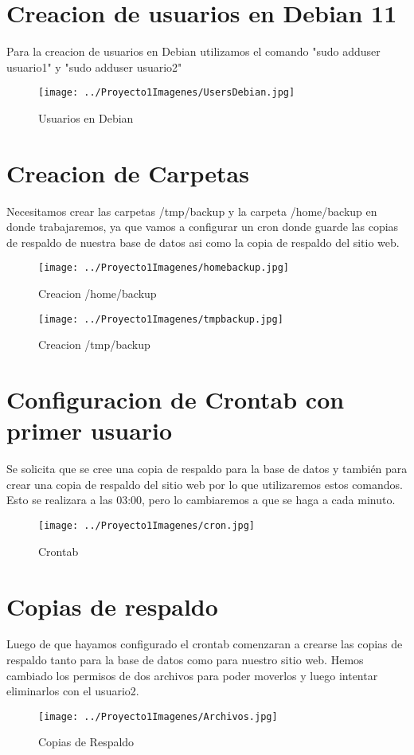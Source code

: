 \documentclass[11pt,a4paper]{article}
\begin{document}
\section{Creacion de usuarios en Debian 11}
Para la creacion de usuarios en Debian utilizamos el comando "sudo adduser usuario1" y "sudo adduser usuario2"
\begin{figure}[hbtp]
\centering
\texttt{[image: ../Proyecto1Imagenes/UsersDebian.jpg]}
\caption{Usuarios en Debian}
\end{figure}
\section{Creacion de Carpetas}
Necesitamos crear las carpetas /tmp/backup y la carpeta /home/backup en donde trabajaremos, ya que vamos a configurar un cron donde guarde las copias de respaldo de nuestra base de datos asi como la copia de respaldo del sitio web.
\begin{figure}[hbtp]
\centering
\texttt{[image: ../Proyecto1Imagenes/homebackup.jpg]}
\caption{Creacion /home/backup}
\end{figure}
\begin{figure}[hbtp]
\centering
\texttt{[image: ../Proyecto1Imagenes/tmpbackup.jpg]}
\caption{Creacion /tmp/backup}
\end{figure}
\newline
\newline
\newline
\newline
\newline
\newline
\newline
\newline
\newline
\newline
\newline
\section{Configuracion de Crontab con primer usuario}
Se solicita que se cree una copia de respaldo para la base de datos y también para crear una copia de respaldo del sitio web por lo que utilizaremos estos comandos. Esto se realizara a las 03:00, pero lo cambiaremos a que se haga a cada minuto.
\begin{figure}[hbtp]
\centering
\texttt{[image: ../Proyecto1Imagenes/cron.jpg]}
\caption{Crontab}
\end{figure}
\section{Copias de respaldo}
Luego de que hayamos configurado el crontab comenzaran a crearse las copias de respaldo tanto para la base de datos como para nuestro sitio web. Hemos cambiado los permisos de dos archivos para poder moverlos y luego intentar eliminarlos con el usuario2.\begin{figure}[hbtp]
\centering
\texttt{[image: ../Proyecto1Imagenes/Archivos.jpg]}
\caption{Copias de Respaldo}
\end{figure}
\end{document}
